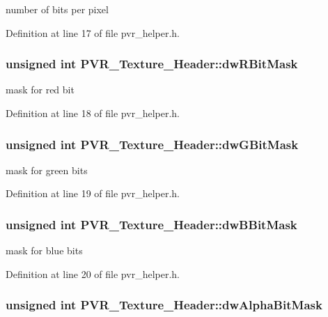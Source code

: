 number of bits per pixel 

Definition at line 17 of file pvr\_\-helper.h.\hypertarget{struct_p_v_r___texture___header_94f02eef9ff95c18c3922ce84b3e59da}{
\subsubsection[dwRBitMask]{\setlength{\rightskip}{0pt plus 5cm}unsigned int {\bf PVR\_\-Texture\_\-Header::dwRBitMask}}}
\label{struct_p_v_r___texture___header_94f02eef9ff95c18c3922ce84b3e59da}


mask for red bit 

Definition at line 18 of file pvr\_\-helper.h.\hypertarget{struct_p_v_r___texture___header_2acd87653ac81f7d304112b48e92bec8}{
\subsubsection[dwGBitMask]{\setlength{\rightskip}{0pt plus 5cm}unsigned int {\bf PVR\_\-Texture\_\-Header::dwGBitMask}}}
\label{struct_p_v_r___texture___header_2acd87653ac81f7d304112b48e92bec8}


mask for green bits 

Definition at line 19 of file pvr\_\-helper.h.\hypertarget{struct_p_v_r___texture___header_9f60e62a5fb60d092357965c265d723d}{
\subsubsection[dwBBitMask]{\setlength{\rightskip}{0pt plus 5cm}unsigned int {\bf PVR\_\-Texture\_\-Header::dwBBitMask}}}
\label{struct_p_v_r___texture___header_9f60e62a5fb60d092357965c265d723d}


mask for blue bits 

Definition at line 20 of file pvr\_\-helper.h.\hypertarget{struct_p_v_r___texture___header_63720b915d8a00edd8d918c91e533cd3}{
\subsubsection[dwAlphaBitMask]{\setlength{\rightskip}{0pt plus 5cm}unsigned int {\bf PVR\_\-Texture\_\-Header::dwAlphaBitMask}}}
\label{struct_p_v_r___texture___header_63720b915d8a00edd8d918c91e533cd3}


